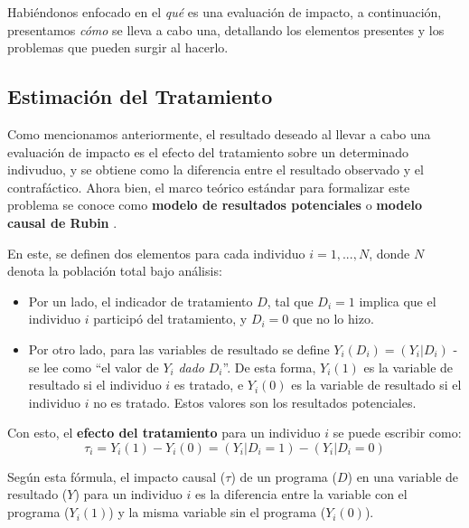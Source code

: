 \documentclass[../../main.tex]{subfiles}
\begin{document}
Habiéndonos enfocado en el \textit{qué} es una evaluación de impacto, a continuación,
presentamos \textit{cómo} se lleva a cabo una, detallando los elementos presentes y los
problemas que pueden surgir al hacerlo.

\subsection{Estimación del Tratamiento}
Como mencionamos anteriormente, el resultado deseado al llevar a cabo una evaluación de
impacto es el efecto del tratamiento sobre un determinado indivuduo, y se obtiene como la
diferencia entre el resultado observado y el contrafáctico. Ahora bien, el marco teórico
estándar para formalizar este problema se conoce como \textbf{modelo de resultados
potenciales} o \textbf{modelo causal de Rubin} \cite{rubin1974}.

En este, se definen dos elementos para cada individuo \(i = 1,...,N\), donde \(N\)
denota la población total bajo análisis:
\begin{itemize}[itemsep=0.2cm]
    \item Por un lado, el indicador de tratamiento \(D\), tal que \(D_i = 1\) implica
    que el individuo \(i\) participó del tratamiento, y \(D_i = 0\) que no lo hizo.
    \item Por otro lado, para las variables de resultado se define \(Y_i(D_i) = (Y_i|D_i)\)
    - se lee como ``el valor de \(Y_i\) \textit{dado} \(D_i\)''. De esta forma, \(Y_i(1)\)
    es la variable de resultado si el individuo \(i\) es tratado, e \(Y_i(0)\) es la
    variable de resultado si el individuo \(i\) no es tratado. Estos valores son los
    resultados potenciales.
\end{itemize}

Con esto, el \textbf{efecto del tratamiento} para un individuo \(i\) se puede escribir como:
\begin{equation}
    \tau_i = Y_i(1) - Y_i(0) = (Y_i|D_i=1) - (Y_i|D_i=0)
    \label{eq:ite} %
\end{equation}

Según esta fórmula, el impacto causal (\(\tau\)) de un programa (\(D\)) en una variable de
resultado (\(Y\)) para un individuo \(i\) es la diferencia entre la variable con el
programa (\(Y_i(1)\)) y la misma variable sin el programa (\(Y_i(0)\)).
\end{document}
